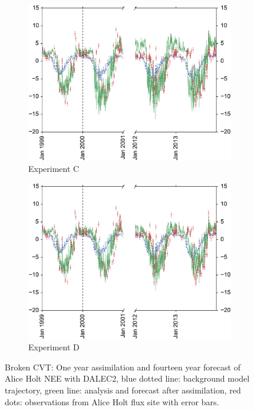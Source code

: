 \documentclass[11pt]{article}
\begin{document}
\begin{figure}
\begin{subfigure}[b]{0.49\textwidth}
        \includegraphics[width=\textwidth]{Cbroke4dvarcvt.eps}
        \caption{Experiment C}
        \label{fig:4dvarBcorR}
    \end{subfigure}
    \begin{subfigure}[b]{0.49\textwidth}
        \includegraphics[width=\textwidth]{Dbroke4dvarcvt.eps}
        \caption{Experiment D}
        \label{fig:4dvaredcBcorR}
    \end{subfigure}
    \caption{Broken CVT: One year assimilation and fourteen year forecast of Alice Holt NEE with DALEC2, blue dotted line: background model trajectory, green line: analysis and forecast after assimilation, red dots: observations from Alice Holt flux site with error bars.}\label{fig:4dvar}
\end{figure}
\end{document}
